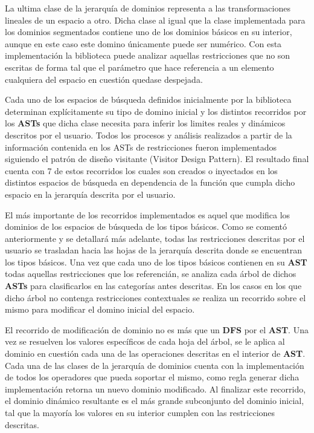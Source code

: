 La ultima clase de la jerarquía de dominios representa a las transformaciones lineales de un espacio a otro. Dicha clase
al igual que la clase implementada para los dominios segmentados contiene uno de los dominios básicos en su interior,
aunque en este caso este domino únicamente puede ser numérico. Con esta implementación la biblioteca puede analizar
aquellas restricciones que no son escritas de forma tal que el parámetro que hace referencia a un elemento cualquiera
del espacio en cuestión quedase despejada.


Cada uno de los espacios de búsqueda definidos inicialmente por la biblioteca determinan explícitamente su tipo de domino
inicial y los distintos recorridos por los {\bf ASTs} que dicha clase necesita para inferir los limites reales y dinámicos
descritos por el usuario. Todos los procesos y análisis realizados a partir de la información contenida en los ASTs de
restricciones fueron implementados siguiendo el patrón de diseño visitante (Visitor Design Pattern). El resultado final
cuenta con 7 de estos recorridos los cuales son creados o inyectados en los distintos espacios de búsqueda en dependencia
de la función que cumpla dicho espacio en la jerarquía descrita por el usuario.

El más importante de los recorridos implementados es aquel que modifica los dominios de los espacios de búsqueda de los
tipos básicos. Como se comentó anteriormente y se detallará más adelante, todas las restricciones descritas por el usuario
se trasladan hacia las hojas de la jerarquía descrita donde se encuentran los tipos básicos. Una vez que cada uno de los
tipos básicos contienen en su {\bf AST} todas aquellas restricciones que los referencián, se analiza cada árbol de dichos {\bf ASTs}
para clasificarlos en las categorías antes descritas. En los casos en los que dicho árbol no contenga restricciones
contextuales se realiza un recorrido sobre el mismo para modificar el domino inicial del espacio.

El recorrido de modificación de dominio no es más que un {\bf DFS} por el {\bf AST}. Una vez se resuelven los valores específicos de cada
hoja del árbol, se le aplica al dominio en cuestión cada una de las operaciones descritas en el interior de {\bf AST}. Cada una de
las clases de la jerarquía de dominios cuenta con la implementación de todos los operadores que pueda soportar el mismo, como
regla generar dicha implementación retorna un nuevo dominio modificado. Al finalizar este recorrido, el dominio dinámico
resultante es el más grande subconjunto del dominio inicial, tal que la mayoría los valores en su interior cumplen con las
restricciones descritas.

